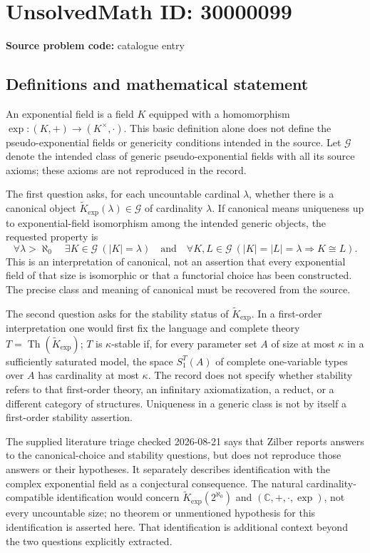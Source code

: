\documentclass[11pt]{article}
\newcommand{\C}{\mathbb{C}}
\begin{document}
\section*{UnsolvedMath ID: 30000099}
\textbf{Source problem code:} catalogue entry
\subsection{Definitions and mathematical statement}
An exponential field is a field \(K\) equipped with a homomorphism \(\exp:(K,+)\to(K^\times,\cdot)\). This basic definition alone does not define the pseudo-exponential fields or genericity conditions intended in the source. Let \(\mathcal G\) denote the intended class of generic pseudo-exponential fields with all its source axioms; these axioms are not reproduced in the record.

The first question asks, for each uncountable cardinal \(\lambda\), whether there is a canonical object \(\widetilde K_{\exp}(\lambda)\in\mathcal G\) of cardinality \(\lambda\). If canonical means uniqueness up to exponential-field isomorphism among the intended generic objects, the requested property is
\[
\forall\lambda>\aleph_0\quad
\exists K\in\mathcal G\ (|K|=\lambda)
\quad\text{and}\quad
\forall K,L\in\mathcal G\ (|K|=|L|=\lambda\Rightarrow K\cong L).
\]
This is an interpretation of canonical, not an assertion that every exponential field of that size is isomorphic or that a functorial choice has been constructed. The precise class and meaning of canonical must be recovered from the source.

The second question asks for the stability status of \(\widetilde K_{\exp}\). In a first-order interpretation one would first fix the language and complete theory \(T=\operatorname{Th}(\widetilde K_{\exp})\); \(T\) is \(\kappa\)-stable if, for every parameter set \(A\) of size at most \(\kappa\) in a sufficiently saturated model, the space \(S_1^T(A)\) of complete one-variable types over \(A\) has cardinality at most \(\kappa\). The record does not specify whether stability refers to that first-order theory, an infinitary axiomatization, a reduct, or a different category of structures. Uniqueness in a generic class is not by itself a first-order stability assertion.

The supplied literature triage checked 2026-08-21 says that Zilber reports answers to the canonical-choice and stability questions, but does not reproduce those answers or their hypotheses. It separately describes identification with the complex exponential field as a conjectural consequence. The natural cardinality-compatible identification would concern \(\widetilde K_{\exp}(2^{\aleph_0})\) and \((\C,+,\cdot,\exp)\), not every uncountable size; no theorem or unmentioned hypothesis for this identification is asserted here. That identification is additional context beyond the two questions explicitly extracted.
\end{document}
